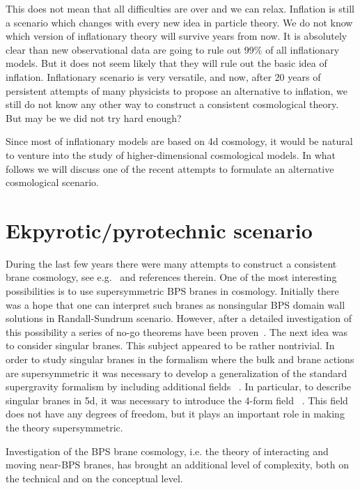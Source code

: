 \documentclass[a4paper,12pt]{article}
\begin{document}
 
This does not mean that all
difficulties are over and we can relax. Inflation is still
a scenario which changes with every new idea in particle theory. 
We do not know which version of inflationary theory will survive
years from now. It is absolutely clear than new observational data are
going to rule out 99\% of all inflationary models. But it does not seem
likely that they will rule out the basic idea of inflation. Inflationary
scenario is very versatile, and now, after 20 years of persistent
attempts of many physicists to propose an alternative to inflation, we
still do not know any other  way to construct a consistent cosmological
theory.  But may be we  did not try hard enough? 


Since most of inflationary models are based on 4d cosmology, it would be natural to venture into the study of higher-dimensional cosmological models. In what follows we will discuss one of the recent attempts to formulate an alternative cosmological scenario. 


 
\section{Ekpyrotic/pyrotechnic scenario}   
 


During the last few years there were many  attempts to construct a   
consistent   brane cosmology, see e.g.~\cite{brane,Binetruy:2000ut,DvaliTye} and references therein. One of the   
most interesting  possibilities is to use supersymmetric BPS branes in   
cosmology. Initially there was a hope that one can interpret such branes as nonsingular BPS domain wall solutions in Randall-Sundrum scenario. However, after a detailed investigation of this possibility a series of no-go theorems have been proven~\cite{KL}. The next idea was to consider singular branes. This subject appeared to be rather nontrivial. In order to study singular branes in the formalism where the bulk and brane  actions are supersymmetric it was necessary to develop a generalization of the standard supergravity formalism by including additional fields ~\cite{BKV}. In particular, to describe singular branes in 5d, it was necessary to introduce the 4-form field \coordHE{}~\cite{BKV}. This field does not have any degrees of freedom, but it plays an important role in making the theory supersymmetric.

Investigation of the BPS brane cosmology, i.e.   
the theory of interacting and moving near-BPS branes, has brought an   
additional level of complexity, both on the technical and on the   
conceptual level. 
\end{document}
